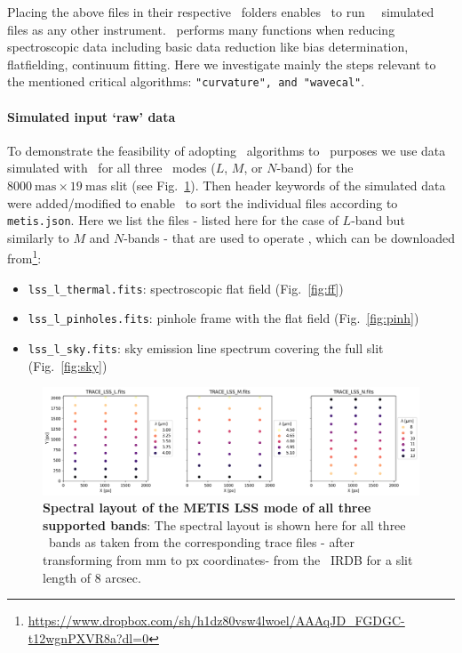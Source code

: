 Placing the above files in their respective \pyred~folders enables \pyred~to run \met~\scope~simulated files as any other instrument. \pyred~performs many functions when reducing spectroscopic data  including basic data reduction like bias determination, flatfielding, continuum fitting. Here we investigate mainly the steps relevant to the mentioned critical algorithms: \texttt{"curvature", and "wavecal"}.
\paragraph{Simulated input `raw' data}
To demonstrate the feasibility of adopting \pyred~algorithms to \met~purposes we use data simulated with \scope~for all three \lss~modes ($L$, $M$, or $N$-band) for the $8000~\mathrm{mas} \times 19~\mathrm{mas}$ slit (see Fig.~\ref{fig:lmn_layout}). 
Then header keywords of the simulated data were added/modified to enable \pyred~to sort the individual files according to \texttt{metis.json}. Here we list the files - listed here for the case of $L$-band but similarly to $M$ and $N$-bands - that are used to operate \pyred, which can be downloaded from\footnote{\url{https://www.dropbox.com/sh/h1dz80vsw4lwoel/AAAqJD_FGDGC-t12wgnPXVR8a?dl=0}}: 
\begin{itemize}
   \item \texttt{lss\_l\_thermal.fits}: spectroscopic flat field (Fig.~\ref{fig:ff})
   \item \texttt{lss\_l\_pinholes.fits}: pinhole frame with the flat field (Fig.~\ref{fig:pinh})
   \item \texttt{lss\_l\_sky.fits}: sky emission line spectrum covering the full slit (Fig.~\ref{fig:sky})
\end{itemize}

\begin{figure}[!h]
  \centering
  \includegraphics[width=\textwidth]{figures/LSS_CrtAlg_files/METIS_LSS_SpectralLayout_px.png}
  \caption{\textbf{Spectral layout of the METIS LSS mode of all three supported bands}: The spectral layout is shown here for all three \lss~bands as taken from the corresponding trace files - after transforming from mm to px coordinates- from the \met~IRDB for a slit length of 8 arcsec.}

  \label{fig:lmn_layout}
\end{figure}

